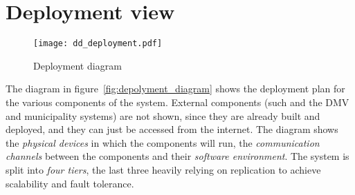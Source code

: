 \section{Deployment view}
\begin{figure}[h]
    \centering
    \texttt{[image: dd\_deployment.pdf]}
    \caption{Deployment diagram}
    \label{fig:depolyment_diagram}
\end{figure}

The diagram in figure~\vref{fig:depolyment_diagram} shows the deployment plan
for the various components of the system. External components (such and the DMV
and municipality systems) are not shown, since they are already built and
deployed, and they can just be accessed from the internet.
The diagram shows the \emph{physical devices} in which the components will run,
the \emph{communication channels} between the components and their
\emph{software environment}.
The system is split into \emph{four tiers}, the last three heavily relying on
replication to achieve scalability and fault tolerance.

